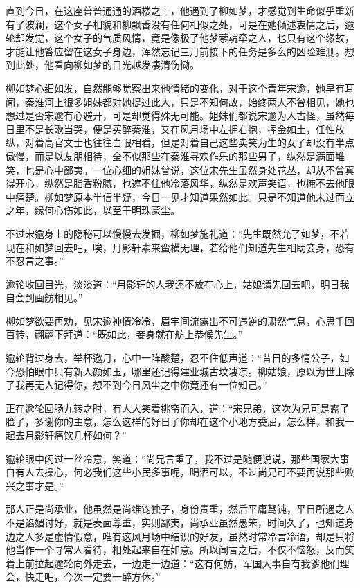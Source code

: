 直到今日，在这座普普通通的酒楼之上，他遇到了柳如梦，才感觉到生命似乎重新有了波澜，这个女子相貌和柳飘香没有任何相似之处，可是在她倾述衷情之后，逾轮却发觉，这个女子的气质风情，竟是像极了他梦萦魂牵之人，也只有这个缘故，才能让他答应留在这女子身边，浑然忘记三月前接下的任务是多么的凶险难测。想到此处，他看向柳如梦的目光越发凄清伤恸。

柳如梦心细如发，自然能够觉察出来他情绪的变化，对于这个青年宋逾，她早有耳闻，秦淮河上很多姐妹都对她提过此人，只是不知何故，始终两人不曾相见，她也想过是否宋逾有心避开，可是却觉得殊无可能。姐妹们都说宋逾为人古怪，虽然每日里不是长歌当哭，便是买醉秦淮，又在风月场中左拥右抱，挥金如土，任性放纵，对着高官文士也往往白眼相看，但是对着自己这些卖笑为生的女子却没有半点傲慢，而是以友朋相待，全不似那些在秦淮寻欢作乐的那些男子，纵然是满面堆笑，也是心中鄙夷。一位心细的姐妹曾说，这位宋先生虽然身处花丛，却从不曾真得开心，纵然是脂香粉腻，也遮不住他冷落风华，纵然是欢声笑语，也掩不去他眼中痛楚。柳如梦原本半信半疑，今日一见才知道果然如此。只是不知道他未过而立之年，缘何心伤如此，以至于明珠蒙尘。

不过宋逾身上的隐秘可以慢慢去发掘，柳如梦施礼道：“先生既然允了如梦，不若现在和如梦回去吧，唉，月影轩素来蛮横无理，若给他们知道先生相助妾身，恐有不忍言之事。”

逾轮收回目光，淡淡道：“月影轩的人我还不放在心上，姑娘请先回去吧，明日我自会到画舫相见。”

柳如梦欲要再劝，见宋逾神情冷冷，眉宇间流露出不可违逆的肃然气息，心思千回百转，翩翩下拜道：“既如此，妾身就在舫上恭候先生。”

逾轮背过身去，举杯邀月，心中一阵酸楚，忍不住低声道：“昔日的多情公子，如今恐怕眼中只有新人颜如玉，哪里还记得建业城古坟凄凉。柳姑娘，原以为世上除了我再无人记得你，想不到今日风尘之中你竟还有一位知己。”

正在逾轮回肠九转之时，有人大笑着挑帘而入，道：“宋兄弟，这次为兄可是露了脸了，多谢你的主意，怎么这样的好日子你却在这个小地方委屈，怎么样，和我一起去月影轩痛饮几杯如何？”

逾轮眼中闪过一丝冷意，笑道：“尚兄言重了，我不过是随便说说，那些国家大事自有人去操心，何必我们这些小民多事呢，喝酒可以，不过尚兄可不要再说那些败兴之事才是。”

那人正是尚承业，他虽然是尚维钧独子，身份贵重，然后平庸驽钝，平日所遇之人不是谄媚讨好，就是表面尊重，实则鄙夷，尚承业虽然愚笨，时间久了，也知道身边之人多是虚情假意，唯有这风月场中结识的好友，虽然时常冷言冷语，却是只将他当作一个寻常人看待，相处起来自在如意。所以闻言之后，不仅不恼怒，反而笑着上前拉起逾轮向外走去，一边走一边道：“这有何妨，军国大事自有我爹他们理会，快走吧，今次一定要一醉方休。”


